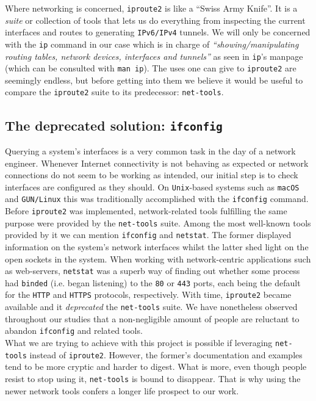         Where networking is concerned, \texttt{iproute2} is like a ``Swiss Army Knife''. It is a \textit{suite} or collection of tools that lets us do everything from inspecting the current interfaces and routes to generating \texttt{IPv6/IPv4} tunnels. We will only be concerned with the \texttt{ip} command in our case which is in charge of \textit{``showing/manipulating routing tables, network devices, interfaces and tunnels''} as seen in \texttt{ip}'s manpage (which can be consulted with \texttt{man ip}). The uses one can give to \texttt{iproute2} are seemingly endless, but before getting into them we believe it would be useful to compare the \texttt{iproute2} suite to its predecessor: \texttt{net-tools}.\\

        \subsection{The deprecated solution: \texttt{ifconfig}}
            Querying a system's interfaces is a very common task in the day of a network engineer. Whenever Internet connectivity is not behaving as expected or network connections do not seem to be working as intended, our initial step is to check interfaces are configured as they should. On \texttt{Unix}-based systems such as \texttt{macOS} and \texttt{GUN/Linux} this was traditionally accomplished with the \texttt{ifconfig} command. Before \texttt{iproute2} was implemented, network-related tools fulfilling the same purpose were provided by the \texttt{net-tools} suite. Among the most well-known tools provided by it we can mention \texttt{ifconfig} and \texttt{netstat}. The former displayed information on the system's network interfaces whilst the latter shed light on the open sockets in the system. When working with network-centric applications such as web-servers, \texttt{netstat} was a superb way of finding out whether some process had \texttt{binded} (i.e. began listening) to the \texttt{80} or \texttt{443} ports, each being the default for the \texttt{HTTP} and \texttt{HTTPS} protocols, respectively. With time, \texttt{iproute2} became available and it \textit{deprecated} the \texttt{net-tools} suite. We have nonetheless observed throughout our studies that a non-negligible amount of people are reluctant to abandon \texttt{ifconfig} and related tools.\\

            What we are trying to achieve with this project is possible if leveraging \texttt{net-tools} instead of \texttt{iproute2}. However, the former's documentation and examples tend to be more cryptic and harder to digest. What is more, even though people resist to stop using it, \texttt{net-tools} is bound to disappear. That is why using the newer network tools confers a longer life prospect to our work.\\


